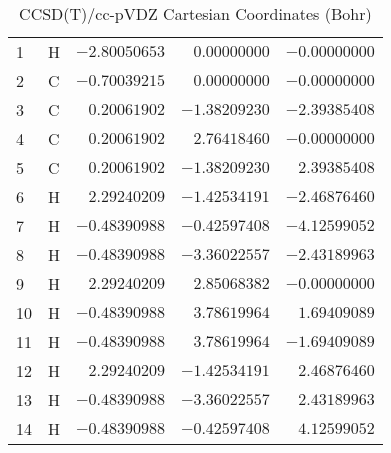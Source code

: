 \documentclass[10pt,oneside]{article}
\begin{document}
\begin{table}[h!]
\centering
\caption{CCSD(T)/cc-pVDZ Cartesian Coordinates (Bohr)}
\begin{tabular}{llrrr}
1  & H  & $-2.80050653$ & $ 0.00000000$ & $-0.00000000$ \\
2  & C  & $-0.70039215$ & $ 0.00000000$ & $-0.00000000$ \\
3  & C  & $ 0.20061902$ & $-1.38209230$ & $-2.39385408$ \\
4  & C  & $ 0.20061902$ & $ 2.76418460$ & $-0.00000000$ \\
5  & C  & $ 0.20061902$ & $-1.38209230$ & $ 2.39385408$ \\
6  & H  & $ 2.29240209$ & $-1.42534191$ & $-2.46876460$ \\
7  & H  & $-0.48390988$ & $-0.42597408$ & $-4.12599052$ \\
8  & H  & $-0.48390988$ & $-3.36022557$ & $-2.43189963$ \\
9  & H  & $ 2.29240209$ & $ 2.85068382$ & $-0.00000000$ \\
10 & H  & $-0.48390988$ & $ 3.78619964$ & $ 1.69409089$ \\
11 & H  & $-0.48390988$ & $ 3.78619964$ & $-1.69409089$ \\
12 & H  & $ 2.29240209$ & $-1.42534191$ & $ 2.46876460$ \\
13 & H  & $-0.48390988$ & $-3.36022557$ & $ 2.43189963$ \\
14 & H  & $-0.48390988$ & $-0.42597408$ & $ 4.12599052$ \\
\end{tabular}
\end{table}
\end{document}

